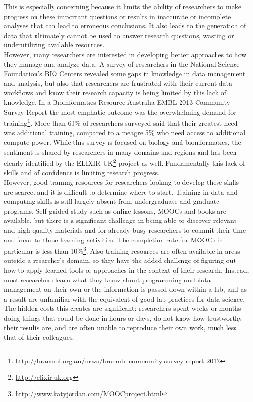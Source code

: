 \documentclass[15]{idcc}
\begin{document}
This is especially concerning because it limits the ability of researchers to make progress on these important questions
 or results in inaccurate or incomplete analyses that can lead to erroneous conclusions. It also
leads to the generation of data that ultimately cannot be used to answer research questions, wasting
or underutilizing available resources.\\

However, many researchers are interested in developing better approaches to how they manage and analyze data.
A survey of researchers in the National Science Foundation's BIO Centers revealed some gaps in knowledge in data management and analysis, but also that researchers are frustrated with
their current data workflows and know their research capacity is being limited by this lack of knowledge.
In a Bioinformatics Resource Australia EMBL 2013 Community Survey Report the most emphatic outcome was the overwhelming demand for
 training\footnote{\url{http://braembl.org.au/news/braembl-community-survey-report-2013}}.
More than 60\% of researchers surveyed said that their greatest need was additional training, compared to a meagre 5\% who need access to additional compute power.
While this survey is focused on biology and bioinformatics, the sentiment is shared by researchers in many domains and
 regions and has been clearly identified by the ELIXIR-UK\footnote{\url{http://elixir-uk.org}} project as well. Fundamentally this lack of skills and of confidence is limiting research progress.\\

However, good training resources for researchers looking to develop these skills are scarce. and it is difficult to determine where to start. Training in data and computing skills is still
largely absent from undergraduate and graduate programs. Self-guided study such as online lessons,
MOOCs and books are available, but there is a significant challenge in being able to discover relevant and high-quality
 materials and for already busy researchers to commit their time and focus to these learning activities. The completion rate for MOOCs in particular is less than
10\%\footnote{\url{http://www.katyjordan.com/MOOCproject.html}}. Also training resources are often available in areas outside a resarcher's domain,
so they have the added challenge of figuring out how to apply learned tools or approaches in the context of their research. Instead, most researchers
learn what they know about programming and data management on their own or the information is passed down within a lab,
and as a result are unfamiliar with the equivalent of good lab practices for data science.  The hidden costs this creates are significant:
researchers spent weeks or months doing things that could be done in hours or days, do not know how trustworthy their results are, and
are often unable to reproduce their own work, much less that of their colleagues.
\end{document}
